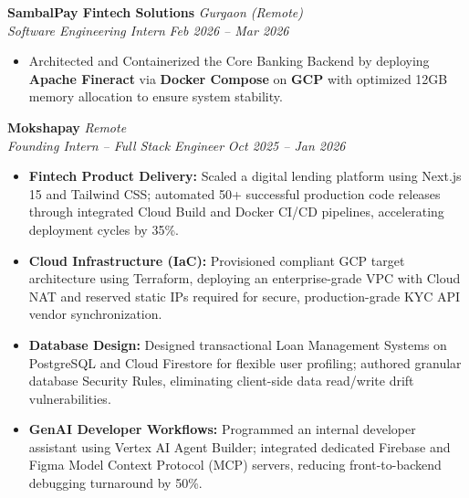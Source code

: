 \documentclass[10pt, a4paper]{article}
\begin{document}
\vspace{0.4ex}
\noindent
\textbf{SambalPay Fintech Solutions} \hfill \textit{Gurgaon (Remote)} \\
\textit{Software Engineering Intern} \hfill \textit{Feb 2026 -- Mar 2026}
\begin{itemize}
    \item Architected and Containerized the Core Banking Backend by deploying \textbf{Apache Fineract} via \textbf{Docker Compose} on \textbf{GCP} with optimized 12GB memory allocation to ensure system stability.
\end{itemize}

\vspace{0.4ex}
\noindent
\textbf{Mokshapay} \hfill \textit{Remote} \\
\textit{Founding Intern -- Full Stack Engineer} \hfill \textit{Oct 2025 -- Jan 2026}
\begin{itemize}
    \item \textbf{Fintech Product Delivery:} Scaled a digital lending platform using Next.js 15 and Tailwind CSS; automated 50+ successful production code releases through integrated Cloud Build and Docker CI/CD pipelines, accelerating deployment cycles by 35\%.
    \item \textbf{Cloud Infrastructure (IaC):} Provisioned compliant GCP target architecture using Terraform, deploying an enterprise-grade VPC with Cloud NAT and reserved static IPs required for secure, production-grade KYC API vendor synchronization.
    \item \textbf{Database Design:} Designed transactional Loan Management Systems on PostgreSQL and Cloud Firestore for flexible user profiling; authored granular database Security Rules, eliminating client-side data read/write drift vulnerabilities.
    \item \textbf{GenAI Developer Workflows:} Programmed an internal developer assistant using Vertex AI Agent Builder; integrated dedicated Firebase and Figma Model Context Protocol (MCP) servers, reducing front-to-backend debugging turnaround by 50\%.
\end{itemize}

\end{document}
